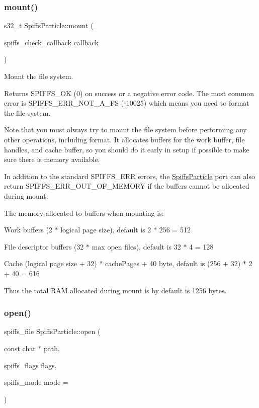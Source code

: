 \subsubsection{\texorpdfstring{mount()}{mount()}}
{\footnotesize\ttfamily s32\+\_\+t Spiffs\+Particle\+::mount (\begin{DoxyParamCaption}\item[{spiffs\+\_\+check\+\_\+callback}]{callback }\end{DoxyParamCaption})}



Mount the file system. 

\begin{DoxyReturn}{Returns}
S\+P\+I\+F\+F\+S\+\_\+\+OK (0) on success or a negative error code. The most common error is S\+P\+I\+F\+F\+S\+\_\+\+E\+R\+R\+\_\+\+N\+O\+T\+\_\+\+A\+\_\+\+FS (-\/10025) which means you need to format the file system.
\end{DoxyReturn}
Note that you must always try to mount the file system before performing any other operations, including format. It allocates buffers for the work buffer, file handles, and cache buffer, so you should do it early in setup if possible to make sure there is memory available.

In addition to the standard S\+P\+I\+F\+F\+S\+\_\+\+E\+RR errors, the \mbox{\hyperlink{class_spiffs_particle}{Spiffs\+Particle}} port can also return S\+P\+I\+F\+F\+S\+\_\+\+E\+R\+R\+\_\+\+O\+U\+T\+\_\+\+O\+F\+\_\+\+M\+E\+M\+O\+RY if the buffers cannot be allocated during mount.

The memory allocated to buffers when mounting is\+:


\begin{DoxyItemize}
\item Work buffers (2 $\ast$ logical page size), default is 2 $\ast$ 256 = 512
\item File descriptor buffers (32 $\ast$ max open files), default is 32 $\ast$ 4 = 128
\item Cache (logical page size + 32) $\ast$ cache\+Pages + 40 byte, default is (256 + 32) $\ast$ 2 + 40 = 616
\end{DoxyItemize}

Thus the total R\+AM allocated during mount is by default is 1256 bytes. \mbox{\label{class_spiffs_particle_a0f13439808a65feb0d307de157598b96}} 
\subsubsection{\texorpdfstring{open()}{open()}}
{\footnotesize\ttfamily spiffs\+\_\+file Spiffs\+Particle\+::open (\begin{DoxyParamCaption}\item[{const char $\ast$}]{path,  }\item[{spiffs\+\_\+flags}]{flags,  }\item[{spiffs\+\_\+mode}]{mode = {} }\end{DoxyParamCaption})\hspace{0.3cm}{\ttfamily [inline]}}




